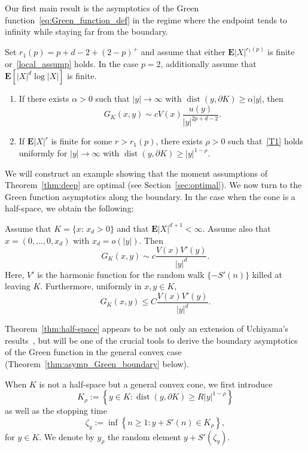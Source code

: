 \documentclass[AHL,Unicode,longabstracts,published]{cedram}
\DeclareMathOperator{\dist}{dist}
\newcommand{\e}{\mathbf{E}}
\renewcommand{\le}{\leqslant}
\renewcommand{\ge}{\geqslant}
\renewcommand{\geq}{\geqslant}
\newcommand*{\alphenumi}{\renewcommand*{\theenumi}{\alph{enumi}}}
\begin{document}
Our first main result is the asymptotics of the Green function~\eqref{eq:Green_function_def} in the regime where the endpoint tends to infinity while staying far from the boundary.
\begin{theo}\label{thm:deep}
Set $r_1(p)=p+d-2+(2-p)^+$ and assume that either $\e| X|^{r_1(p)}$ is finite or~\eqref{local_assump} holds. In the case $p=2$, additionally assume that $\e[| X|^d\log| X|]$ is finite.
%
\begin{enumerate}\alphenumi
\item\label{itA}
If there exists $\alpha>0$ such that $| y|\to\infty$ with $\dist(y,\partial K)\ge \alpha| y|$, then
\begin{equation}\label{T1}
G_K(x,y)
\sim cV(x)\frac{u(y)}{| y|^{2p+d-2}}.
\end{equation}
\item\label{itB}
If $\e| X|^{r}$ is finite for some $r>r_1(p)$, there exists $\rho>0$ such that~\eqref{T1} holds uniformly for $| y|\to\infty$ with $\dist(y,\partial K)\ge | y| ^{1-\rho}$.
\end{enumerate}
\end{theo}

We will construct an example showing that the moment assumptions of Theorem~\ref{thm:deep} are optimal (see Section~\ref{sec:optimal}). We now turn to the Green function asymptotics along the boundary. In the case when the cone is a half-space, we obtain the following:

\begin{theo}\label{thm:half-space}
Assume that $K=\{x:\, x_d>0\}$ and that $\e| X|^{d+1}<\infty$. Assume also that $x=(0,\ldots,0,x_d)$ with $x_d=o(| y|)$. Then
\[
G_K(x,y)\sim c\frac{V(x)V'(y)}{| y|^d}.
\]
Here, $V'$ is the harmonic function for the random walk $\{-S'(n)\}$ killed at leaving $K$. Furthermore, uniformly in $x,y\in K$,
\[
G_K(x,y)\le C\frac{V(x)V'(y)}{|y|^{d}}.
\]
\end{theo}

Theorem~\ref{thm:half-space} appears to be not only an extension of Uchiyama's results~\cite{Uc-14}, but will be one of the crucial tools to derive the boundary asymptotics of the Green function in the general convex case (Theorem~\ref{thm:asymp_Green_boundary} below).

When $K$ is not a half-space but a general convex cone, we first introduce
\begin{equation}\label{eq:K_rho}
{K}_{\rho}:=\left\{ y\in{K}:\dist(y,\partial {K})\geq R| y|^{1-\rho}\right\}
\end{equation}
as well as the stopping time
\begin{equation}\label{eq:stopping_time_theta}
\zeta_{y}:=\inf\left\{n\geq 1: y+S'(n)\in {K}_{\rho}\right\},
\end{equation}
for $y\in{K}$. We denote by $y_{\rho}$ the random element $y+S'(\zeta_{y})$.
\end{document}

